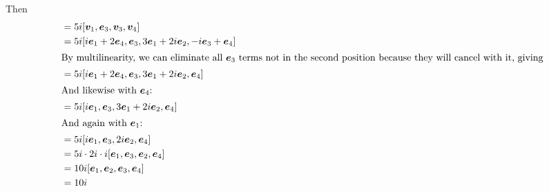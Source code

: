 \documentclass{article}
\begin{document}
Then
\begin{align*}
	[\bm v_1, \bm v_2, \bm v_3, \bm v_4]
	 & = 5i[\bm v_1, \bm e_3, \bm v_3, \bm v_4]                                      \\
	 & = 5i[i\bm e_1 + 2\bm e_4, \bm e_3, 3\bm e_1 + 2i\bm e_2, -i\bm e_3 + \bm e_4] \\
	\intertext{By multilinearity, we can eliminate all $\bm e_3$ terms not in the second position because they will cancel with it, giving}
	 & = 5i[i\bm e_1 + 2\bm e_4, \bm e_3, 3\bm e_1 + 2i\bm e_2, \bm e_4]             \\
	\intertext{And likewise with $\bm e_4$:}
	 & = 5i[i\bm e_1, \bm e_3, 3\bm e_1 + 2i\bm e_2, \bm e_4]                        \\
	\intertext{And again with $\bm e_1$:}
	 & = 5i[i\bm e_1, \bm e_3, 2i\bm e_2, \bm e_4]                                   \\
	 & = 5i\cdot 2i \cdot i[\bm e_1, \bm e_3, \bm e_2, \bm e_4]                      \\
	 & = 10i[\bm e_1, \bm e_2, \bm e_3, \bm e_4]                                     \\
	 & = 10i
\end{align*}
\end{document}
